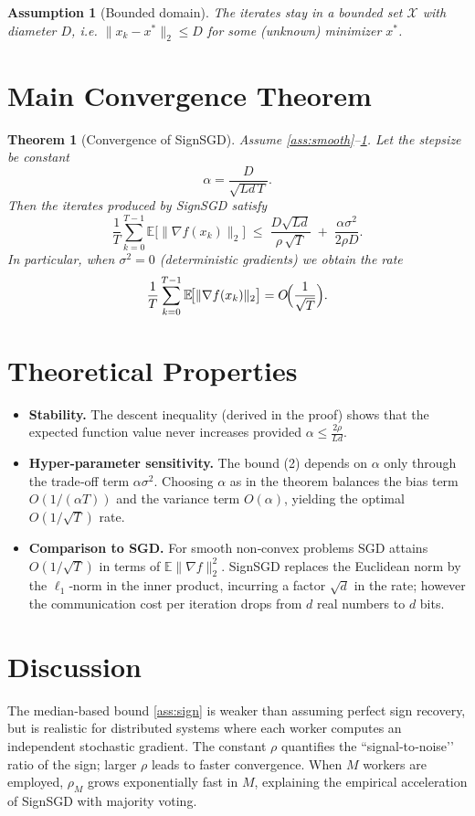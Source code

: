 \documentclass{article}
\newtheorem{theorem}{Theorem}
\newtheorem{assumption}{Assumption}
\newcommand{\E}{\mathbb{E}}
\begin{document}
\begin{assumption}[Bounded domain]\label{ass:bounded}
The iterates stay in a bounded set $\mathcal X$ with diameter $D$, i.e. $\|x_k-x^{*}\|_{2}\le D$ for some (unknown) minimizer $x^{*}$.
\end{assumption}

\section*{Main Convergence Theorem}
\begin{theorem}[Convergence of SignSGD]\label{thm:main}
Assume \ref{ass:smooth}–\ref{ass:bounded}. Let the stepsize be constant
\[
\alpha = \frac{D}{\sqrt{L d\,T}} .
\]
Then the iterates produced by SignSGD satisfy
\[
\frac{1}{T}\sum_{k=0}^{T-1}\E\!\bigl[\|\nabla f(x_k)\|_{2}\bigr]
\;\le\;
\frac{D\sqrt{L d}}{\rho\,\sqrt{T}}
\;+\;
\frac{\alpha\sigma^{2}}{2\rho D } .
\tag{2}
\]
In particular, when $\sigma^{2}=0$ (deterministic gradients) we obtain the rate
\[
\frac{1}{T}\sum_{k=0}^{T-1}\E\!\bigl[\|\nabla f(x_k)\|_{2}\bigr]
= O\!\Bigl(\frac{1}{\sqrt{T}}\Bigr).
\]
\end{theorem}

\section*{Theoretical Properties}
\begin{itemize}
\item \textbf{Stability.}  The descent inequality (derived in the proof) shows that the expected function value never increases provided $\alpha\le \frac{2\rho}{L d}$.
\item \textbf{Hyper‑parameter sensitivity.}  The bound (2) depends on $\alpha$ only through the trade‑off term $\alpha\sigma^{2}$.  Choosing $\alpha$ as in the theorem balances the bias term $O(1/(\alpha T))$ and the variance term $O(\alpha)$, yielding the optimal $O(1/\sqrt{T})$ rate.
\item \textbf{Comparison to SGD.}  For smooth non‑convex problems SGD attains $O(1/\sqrt{T})$ in terms of $\E\|\nabla f\|_{2}^{2}$.  SignSGD replaces the Euclidean norm by the $\ell_{1}$‑norm in the inner product, incurring a factor $\sqrt{d}$ in the rate; however the communication cost per iteration drops from $d$ real numbers to $d$ bits.
\end{itemize}

\section*{Discussion}
The median‑based bound \eqref{ass:sign} is weaker than assuming perfect sign recovery, but is realistic for distributed systems where each worker computes an independent stochastic gradient.  The constant $\rho$ quantifies the “signal‑to‑noise’’ ratio of the sign; larger $\rho$ leads to faster convergence.  When $M$ workers are employed, $\rho_M$ grows exponentially fast in $M$, explaining the empirical acceleration of SignSGD with majority voting.
\end{document}
